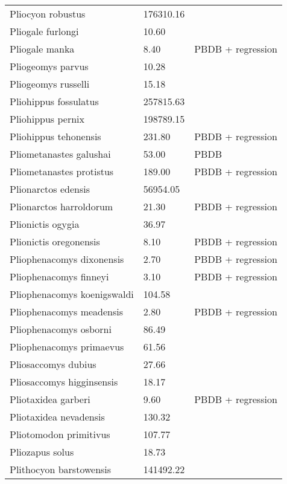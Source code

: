 \begin{longtable}{p{} p{} p{}}
    Pliocyon robustus & 176310.16 & \cite{Tomiya2013} \\ 
    Pliogale furlongi & 10.60 & \cite{Wood1962} \\ 
    Pliogale manka & 8.40 & PBDB + regression \\ 
    Pliogeomys parvus & 10.28 & \cite{Tomiya2013} \\ 
    Pliogeomys russelli & 15.18 & \cite{Tomiya2013} \\ 
    Pliohippus fossulatus & 257815.63 & \cite{Tomiya2013} \\ 
    Pliohippus pernix & 198789.15 & \cite{Tomiya2013} \\ 
    Pliohippus tehonensis & 231.80 & PBDB + regression \\ 
    Pliometanastes galushai & 53.00 & PBDB \\ 
    Pliometanastes protistus & 189.00 & PBDB + regression \\ 
    Plionarctos edensis & 56954.05 & \cite{Tomiya2013} \\ 
    Plionarctos harroldorum & 21.30 & PBDB + regression \\ 
    Plionictis ogygia & 36.97 & \cite{Tomiya2013} \\ 
    Plionictis oregonensis & 8.10 & PBDB + regression \\ 
    Pliophenacomys dixonensis & 2.70 & PBDB + regression \\ 
    Pliophenacomys finneyi & 3.10 & PBDB + regression \\ 
    Pliophenacomys koenigswaldi & 104.58 & \cite{Tomiya2013} \\ 
    Pliophenacomys meadensis & 2.80 & PBDB + regression \\ 
    Pliophenacomys osborni & 86.49 & \cite{Tomiya2013} \\ 
    Pliophenacomys primaevus & 61.56 & \cite{Tomiya2013} \\ 
    Pliosaccomys dubius & 27.66 & \cite{Tomiya2013} \\ 
    Pliosaccomys higginsensis & 18.17 & \cite{Tomiya2013} \\ 
    Pliotaxidea garberi & 9.60 & PBDB + regression \\ 
    Pliotaxidea nevadensis & 130.32 & \cite{Tomiya2013} \\ 
    Pliotomodon primitivus & 107.77 & \cite{Tomiya2013} \\ 
    Pliozapus solus & 18.73 & \cite{Tomiya2013} \\ 
    Plithocyon barstowensis & 141492.22 & \cite{Tomiya2013} \\ 

\end{longtable}
